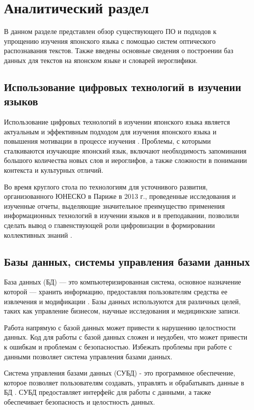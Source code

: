 \chapter{Аналитический раздел}

В данном разделе представлен обзор существующего ПО
и подходов к упрощению изучения японского языка с
помощью систем оптического распознавания текстов. Также
введены основные сведения о построении баз данных
для текстов на японском языке и словарей иероглифики.

\section{Использование цифровых технологий в изучении языков}

Использование цифровых технологий в изучении японского языка 
является актуальным и эффективным подходом для изучения
японского языка и повышения мотивации в процессе
изучения \cite{digital-era}. Проблемы, с которыми сталкиваются
изучающие японский язык, включают необходимость запоминания большого количества новых
слов и иероглифов, а также сложности в понимании контекста
и культурных отличий.

Во время круглого стола по технологиям для усточнивого развития, организованного 
ЮНЕСКО в Париже в 2013 г.,
проведенные исследования и изученные отчеты, выделяющие значительное
преимущество применения информационных технологий в изучении языков
и в преподавании, позволили сделать вывод о главенствующей роли
цифровизации в формировании коллективных знаний \cite{japanese-comp}.

\section{Базы данных, системы управления базами данных}

База данных (БД) --- это компьютеризированная система, основное назначение
которой --- хранить информацию, предоставляя пользователям
средства ее извлечения и модификации \cite[46]{date}. Базы данных
используются для различных целей, таких как управление бизнесом,
научные исследования и медицинские записи.

Работа напрямую с базой данных может привести к нарушению целостности данных. 
Код для работы с базой данных сложен и неудобен, что может привести к ошибкам 
и проблемам с безопасностью. Избежать проблемы при работе с данными позволяет 
система управления базами данных.

Система управления базами данных (СУБД) - это программное
обеспечение, которое позволяет пользователям создавать,
управлять и обрабатывать данные в БД \cite[10--12]{pearson-subd}.
СУБД предоставляет интерфейс для работы с данными, а также обеспечивает
безопасность и целостность данных.

